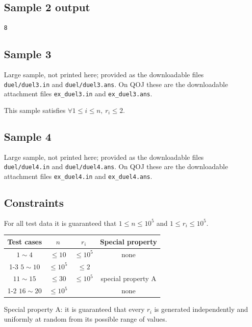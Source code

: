 \documentclass[11pt]{article}
\begin{document}
\subsection*{Sample 2 output}

\begin{verbatim}
8
\end{verbatim}

\subsection*{Sample 3}

Large sample, not printed here;
provided as the downloadable files \texttt{duel/duel3.in} and \texttt{duel/duel3.ans}.
On QOJ these are the downloadable attachment files \texttt{ex\_duel3.in}
and \texttt{ex\_duel3.ans}.

This sample satisfies $\forall 1 \le i \le n,\ r_i \le 2$.

\subsection*{Sample 4}

Large sample, not printed here;
provided as the downloadable files \texttt{duel/duel4.in} and \texttt{duel/duel4.ans}.
On QOJ these are the downloadable attachment files \texttt{ex\_duel4.in}
and \texttt{ex\_duel4.ans}.

\subsection*{Constraints}

For all test data it is guaranteed that $1 \le n \le 10^5$ and
$1 \le r_i \le 10^5$.

\begin{center}
\begin{tabular}{|c|c|c|c|}
\hline
Test cases & $n$ & $r_i$ & Special property \\
\hline
$1 \sim 4$ & $\le 10$ & $\le 10^5$ & none \\
\cline{1-3}
$5 \sim 10$ & $\le 10^5$ & $\le 2$ & \\
\hline
$11 \sim 15$ & $\le 30$ & $\le 10^5$ & special property A \\
\cline{1-2}\cline{4-4}
$16 \sim 20$ & $\le 10^5$ & & none \\
\hline
\end{tabular}
\end{center}

Special property A: it is guaranteed that every $r_i$ is generated
independently and uniformly at random from its possible range of values.
\end{document}
